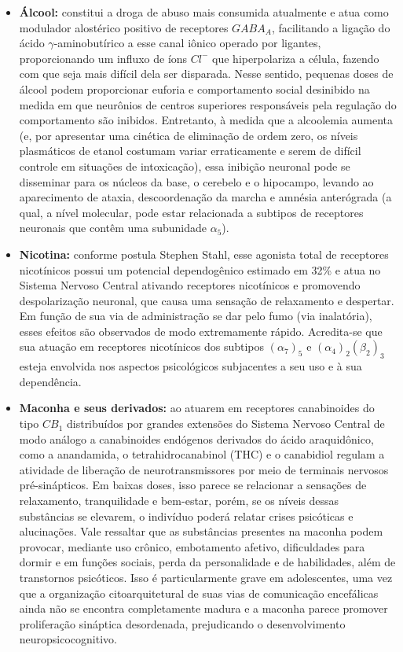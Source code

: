 \documentclass[
]{book}
\theoremstyle{definition}
\theoremstyle{definition}
\theoremstyle{definition}
\theoremstyle{definition}
\theoremstyle{remark}
\begin{document}
\begin{itemize}
\item
  \textbf{Álcool:} constitui a droga de abuso mais consumida atualmente e atua como modulador alostérico positivo de receptores \(GABA_A\), facilitando a ligação do ácido \(\gamma\)-aminobutírico a esse canal iônico operado por ligantes, proporcionando um influxo de íons \(Cl^-\) que hiperpolariza a célula, fazendo com que seja mais difícil dela ser disparada. Nesse sentido, pequenas doses de álcool podem proporcionar euforia e comportamento social desinibido na medida em que neurônios de centros superiores responsáveis pela regulação do comportamento são inibidos. Entretanto, à medida que a alcoolemia aumenta (e, por apresentar uma cinética de eliminação de ordem zero, os níveis plasmáticos de etanol costumam variar erraticamente e serem de difícil controle em situações de intoxicação), essa inibição neuronal pode se disseminar para os núcleos da base, o cerebelo e o hipocampo, levando ao aparecimento de ataxia, descoordenação da marcha e amnésia anterógrada (a qual, a nível molecular, pode estar relacionada a subtipos de receptores neuronais que contêm uma subunidade \(\alpha_5\)).
\item
  \textbf{Nicotina:} conforme postula Stephen Stahl, esse agonista total de receptores nicotínicos possui um potencial dependogênico estimado em 32\% e atua no Sistema Nervoso Central ativando receptores nicotínicos e promovendo despolarização neuronal, que causa uma sensação de relaxamento e despertar. Em função de sua via de administração se dar pelo fumo (via inalatória), esses efeitos são observados de modo extremamente rápido. Acredita-se que sua atuação em receptores nicotínicos dos subtipos \((\alpha_7)_5\) e \((\alpha_4)_2(\beta_2)_3\) esteja envolvida nos aspectos psicológicos subjacentes a seu uso e à sua dependência.
\item
  \textbf{Maconha e seus derivados:} ao atuarem em receptores canabinoides do tipo \(CB_1\) distribuídos por grandes extensões do Sistema Nervoso Central de modo análogo a canabinoides endógenos derivados do ácido araquidônico, como a anandamida, o tetrahidrocanabinol (THC) e o canabidiol regulam a atividade de liberação de neurotransmissores por meio de terminais nervosos pré-sinápticos. Em baixas doses, isso parece se relacionar a sensações de relaxamento, tranquilidade e bem-estar, porém, se os níveis dessas substâncias se elevarem, o indivíduo poderá relatar crises psicóticas e alucinações. Vale ressaltar que as substâncias presentes na maconha podem provocar, mediante uso crônico, embotamento afetivo, dificuldades para dormir e em funções sociais, perda da personalidade e de habilidades, além de transtornos psicóticos. Isso é particularmente grave em adolescentes, uma vez que a organização citoarquitetural de suas vias de comunicação encefálicas ainda não se encontra completamente madura e a maconha parece promover proliferação sináptica desordenada, prejudicando o desenvolvimento neuropsicocognitivo.

\end{itemize}
\end{document}
